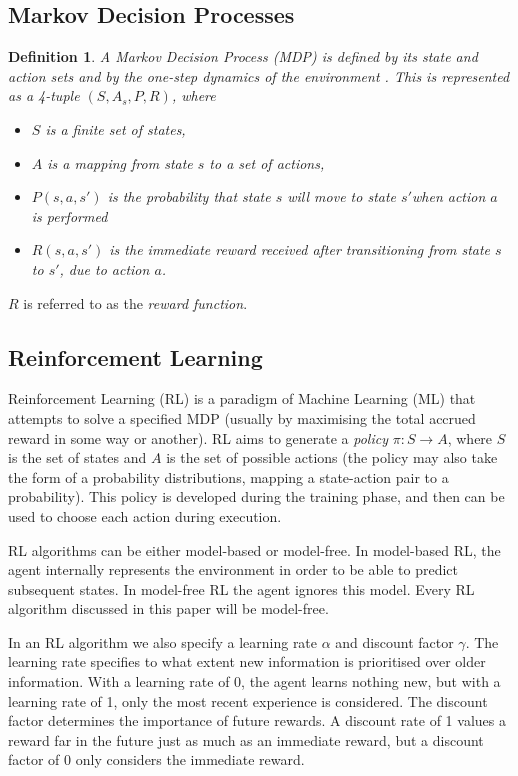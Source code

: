 \newtheorem{definition}{Definition}[subsection]


\subsection{Markov Decision Processes}
\begin{definition}

A Markov Decision Process (MDP) is defined by its state and action sets and by the one-step dynamics of the environment \cite{RLAnIntro}. This is represented as a 4-tuple $(S, A_{s}, P, R)$, where
\begin{itemize}
  \item $S$ is a finite set of states,
  \item $A$ is a mapping from state $s$ to a set of actions,
  \item $P(s, a, s')$ is the probability that state $s$ will move to state $s'$when action $a$ is performed
  \item $R(s, a, s')$ is the immediate reward received after transitioning from state $s$ to $s'$, due to action $a$.
\end{itemize}

\end{definition}
$R$ is referred to as the \textit{reward function}.

\subsection{Reinforcement Learning}
Reinforcement Learning (RL) is a paradigm of Machine Learning (ML) that attempts to solve a specified MDP (usually by maximising the total accrued reward in some way or another). RL aims to generate a \textit{policy} $\pi : S \to A$, where $S$ is the set of states and $A$ is the set of possible actions (the policy may also take the form of a probability distributions, mapping a state-action pair to a probability). This policy is developed during the training phase, and then can be used to choose each action during execution.

RL algorithms can be either model-based or model-free. In model-based RL, the agent internally represents the environment in order to be able to predict subsequent states. In model-free RL the agent ignores this model. Every RL algorithm discussed in this paper will be model-free.

In an RL algorithm we also specify a learning rate $\alpha$ and discount factor $\gamma$. The learning rate specifies to what extent new information is prioritised over older information. With a learning rate of 0, the agent learns nothing new, but with a learning rate of 1, only the most recent experience is considered. The discount factor determines the importance of future rewards. A discount rate of 1 values a reward far in the future just as much as an immediate reward, but a discount factor of 0 only considers the immediate reward.




